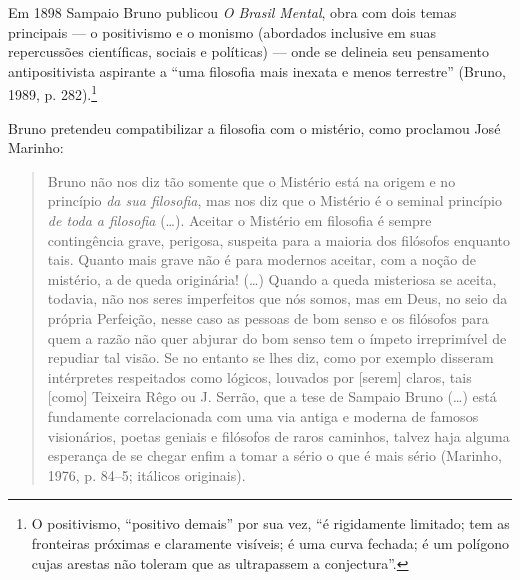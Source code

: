 Em 1898 Sampaio Bruno publicou \emph{O Brasil Mental}, obra com
dois temas principais --- o positivismo e o monismo (abordados
inclusive em suas repercussões científicas, sociais e políticas)
--- onde se delineia seu pensamento antipositivista aspirante a
“uma filosofia mais inexata e menos terrestre” (Bruno, 1989, p.
282).\footnote{ O positivismo, “positivo demais” por sua vez, “é
rigidamente limitado; tem as fronteiras próximas e claramente
visíveis; é uma curva fechada; é um polígono cujas arestas não
toleram que as ultrapassem a conjectura”.} 

Bruno pretendeu compatibilizar a filosofia com o mistério, como
proclamou José Marinho:

\begin{quote}
Bruno não nos diz tão somente que o Mistério está na origem e no
princípio \emph{da sua filosofia}, mas nos diz que o Mistério
é o seminal princípio \emph{de toda a filosofia} (\ldots{}).
Aceitar o Mistério em filosofia é sempre contingência grave,
perigosa, suspeita para a maioria dos filósofos enquanto tais.
Quanto mais grave não é para modernos aceitar, com a noção de
mistério, a de queda originária!
(\ldots{}) Quando a queda misteriosa se aceita, todavia, não nos
seres imperfeitos que nós somos, mas em Deus, no seio da própria
Perfeição, nesse caso as pessoas de bom senso e os filósofos
para quem a razão não quer abjurar do bom senso tem o ímpeto
irreprimível de repudiar tal visão. Se no entanto se lhes diz,
como por exemplo disseram intérpretes respeitados como lógicos,
louvados por [serem] claros, tais [como] Teixeira Rêgo ou J.
Serrão, que a tese de Sampaio Bruno (\ldots{}) está fundamente
correlacionada com uma via antiga e moderna de famosos
visionários, poetas geniais e filósofos de raros caminhos,
talvez haja alguma esperança de se chegar enfim a tomar a sério
o que é mais sério (Marinho, 1976, p. 84--5; itálicos originais).
\end{quote}

